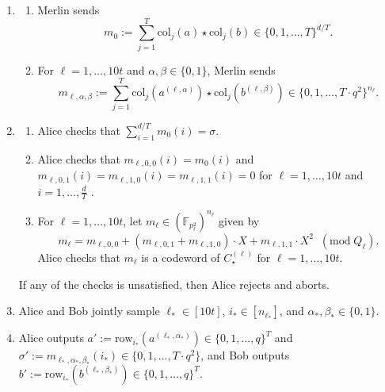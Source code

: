 \documentclass[11pt]{article}
\theoremstyle{plain}
\theoremstyle{remark}
\newcommand{\F}{\mathbb{F}}
\newcommand{\row}{\mathrm{row}}
\newcommand{\col}{\mathrm{col}}
\begin{document}
\begin{enumerate} 
\item \label{step:merlin}

\begin{enumerate}

\item \label{stp:merlin_1}

Merlin sends
$$m_0 := \sum_{j=1}^T  \col_j(a) \star \col_j(b) \in \{0,1,\ldots,T\}^{d/T}.$$

 \item For $\ell=1, \ldots, 10 t$ 
and $\alpha, \beta \in \{0,1\}$, Merlin sends
 $$m_{\ell,\alpha,\beta}:=\sum_{j=1}^T  \col_j(a^{(\ell,\alpha)}) \star \col_j(b^{(\ell,\beta)}) \in \{ 0,1, \ldots,T\cdot q^2\}^{n_\ell }.$$
 
 \end{enumerate}
 
 \item \label{step:alice_check}

\begin{enumerate}

\item \label{step:alice_check_sum} Alice checks that $\sum_{i=1}^{d/T} m_0(i) = \sigma$.


\item   \label{step:alice_check_con} Alice checks that $m_{\ell,0,0}(i) = m_0(i)$ and  $m_{\ell, 0,1} (i) =m_{\ell,1,0} (i) = m_{\ell,1,1} (i)=0$ for $\ell=1, \ldots, 10 t$ and  $i = 1, \ldots, \frac d T$ .

\item \label{step:alice_check_code}
For $\ell = 1, \ldots, 10 t$, let $m_\ell \in (\F_{p_\ell^2})^{n_\ell}$ given by 
$$  m_\ell = 
      m_{\ell,0,0}   + ( m_{\ell,0,1}   + m_{\ell,1,0} ) \cdot X +  m_{\ell,1,1}   \cdot X^2   \;\;(\mathrm{mod} \;Q_\ell).$$
      Alice checks that $m_\ell$ is a codeword of $C_\star^{(\ell)}$ for $\ell=1, \ldots, 10 t$.

 
 \end{enumerate}
 
 If any of the checks is unsatisfied, then Alice rejects and aborts.

\item \label{step:random} Alice and Bob jointly sample $\ell_* \in [10 t]$, $i_* \in[n_{\ell_*}]$, and $\alpha_*, \beta_* \in \{0,1\}$.

\item  \label{step:output}
Alice outputs $a' := \row_{i_*}(a^{(\ell_*,\alpha_*)}) \in \{0,1,\ldots,q\}^T$ and $\sigma' := m_{\ell_*,\alpha_*,\beta_*} (i_*)\in \{0,1,\ldots, T \cdot q^2\}$, and Bob outputs  $ b':=\row_{i_*}(b^{(\ell_*,\beta_*)}) \in \{0,1,\ldots,q\}^T$.
\end{enumerate}
\end{document}
